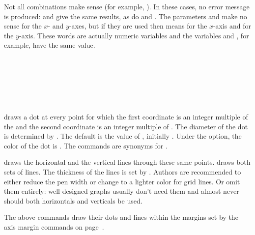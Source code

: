 \documentclass[letterpaper]{article}
\begin{document}
Not all combinations make sense (for example,
). In these cases, no error message
is produced:  and  give the same results, as do
 and . The parameters  and
 make no sense for the $x$- and $y$-axes, but if they are
used then  means  for the $x$-axis and
 for the $y$-axis. These words are actually \MF{} numeric
variables and the variables  and , for example,
have the same value.

\begin{cd}
\\
\\
\\
\\
\\
%
%
%
%
%
%
%
\end{cd}

 draws a dot at every point for which the first coordinate is
an integer multiple of the  and the second coordinate is an
integer multiple of . The diameter of the dot is determined
by . The default is the value of ,
initially \dim{0.5pt}. Under the  option, the color of the
dot is . The commands 
are synonyms for .

 draws the horizontal and  the vertical
lines through these same points.  draws both sets of
lines. The thickness of the lines is set by . Authors are
recommended to either reduce the pen width or change  to
a lighter color for grid lines. Or omit them entirely: well-designed
graphs usually don't need them and almost never should both horizontals
and verticals be used.

The above commands draw their dots and lines within the margins set by the
axis margin commands on page~\pageref{axismargin}.

\begin{cd}
\\
\\
\\
\\
%
%
%
%
%
%
\end{cd}
\end{document}
